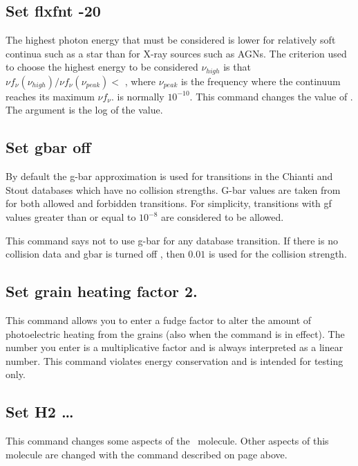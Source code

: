 \subsection{Set flxfnt -20}

The highest photon energy that must be considered is lower for relatively
soft continua such as a star than for X-ray sources such as AGNs.
The
criterion used to choose the highest energy to be considered
$\nu_{high}$ is that
$\nu f_\nu (\nu_{high}) /\nu f_\nu (\nu_{peak}) < $ ,
where $\nu_{peak}$ is the frequency where
the continuum reaches its maximum $\nu f_\nu$.
 is normally $10^{-10}$.
This
command changes the value of .
The argument is the log of the value.

\subsection{Set gbar off}
\label{sec:Setgbar}
By default the g-bar approximation is used for transitions in the 
Chianti and Stout databases 
which have no collision strengths.
G-bar values are taken from \citet{Mewe1972} for both allowed and forbidden transitions.
For simplicity, transitions with gf values greater than or equal to $10^{-8}$ are considered to be allowed.

This command says not to use g-bar for any database transition. 
If there is no collision data and gbar is turned off , 
then $0.01$ is used for the collision strength.

\subsection{Set grain heating factor 2.}

This command allows you to enter a fudge factor to alter the amount of
photoelectric heating from the grains (also when the 
command is in effect). The number you enter is a multiplicative factor and
is always interpreted as a linear number. This command violates energy
conservation and is intended for testing only.

\subsection{Set H2 \dots}
\label{sec:SetH2}

This command changes some aspects of the \htwo\ molecule.
Other aspects
of this molecule are changed with the  command
described on page \pageref{sec:AtomH2} above.

